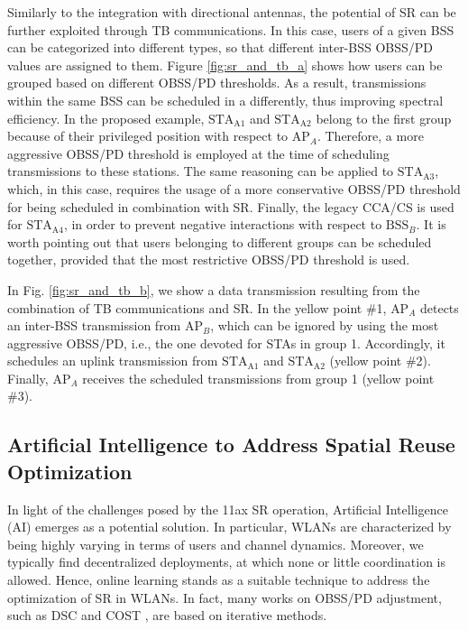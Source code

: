 \documentclass{ieeeaccess}
\begin{document}
Similarly to the integration with directional antennas, the potential of SR can be further exploited through TB communications. In this case, users of a given BSS can be categorized into different types, so that different inter-BSS OBSS/PD values are assigned to them. Figure \ref{fig:sr_and_tb_a} shows how users can be grouped based on different OBSS/PD thresholds. As a result, transmissions within the same BSS can be scheduled in a differently, thus improving spectral efficiency. In the proposed example, $\text{STA}_\text{A1}$ and $\text{STA}_\text{A2}$ belong to the first group because of their privileged position with respect to $\text{AP}_A$. Therefore, a more aggressive OBSS/PD threshold is employed at the time of scheduling transmissions to these stations. The same reasoning can be applied to $\text{STA}_\text{A3}$, which, in this case, requires the usage of a more conservative OBSS/PD threshold for being scheduled in combination with SR. Finally, the legacy CCA/CS is used for $\text{STA}_\text{A4}$, in order to prevent negative interactions with respect to $\text{BSS}_B$. It is worth pointing out that users belonging to different groups can be scheduled together, provided that the most restrictive OBSS/PD threshold is used. 

In Fig. \ref{fig:sr_and_tb_b}, we show a data transmission resulting from the combination of TB communications and SR. In the yellow point \#1, $\text{AP}_A$ detects an inter-BSS transmission from $\text{AP}_B$, which can be ignored by using the most aggressive OBSS/PD, i.e., the one devoted for STAs in group 1. Accordingly, it schedules an uplink transmission from $\text{STA}_\text{A1}$ and $\text{STA}_\text{A2}$ (yellow point \#2). Finally, $\text{AP}_A$ receives the scheduled transmissions from group 1 (yellow point \#3).

\subsection{Artificial Intelligence to Address Spatial Reuse Optimization}
In light of the challenges posed by the 11ax SR operation, Artificial Intelligence (AI) emerges as a potential solution. In particular, WLANs are characterized by being highly varying in terms of users and channel dynamics. Moreover, we typically find decentralized deployments, at which none or little coordination is allowed. Hence, online learning stands as a suitable technique to address the optimization of SR in WLANs. In fact, many works on OBSS/PD adjustment, such as DSC \cite{smith2015dynamic} and COST \cite{selinis2018control}, are based on iterative methods. 
\end{document}
